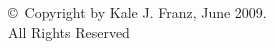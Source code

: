 

\cleardoublepage

\thispagestyle{empty}
\begin{center}
    \copyright \ Copyright by Kale J. Franz, June 2009. \\
    All Rights Reserved
\end{center}
\pagebreak
\clearpage

\addtolength{\textheight}{-0.6in}

